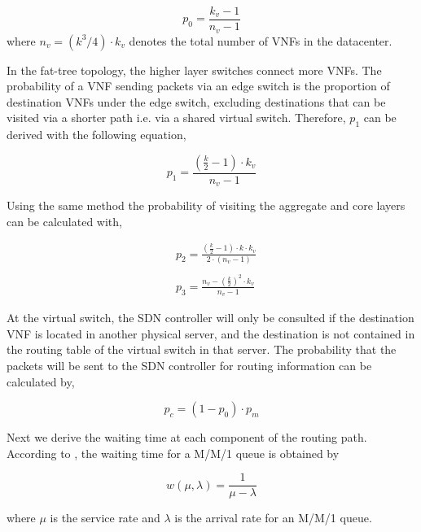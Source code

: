 \begin{equation}
    \label{eq:p_vm}
    p_{0} = \frac{k_{v} - 1}{n_v - 1}
\end{equation}
\noindent where $n_v = (k^3/4)\cdot k_v$ denotes the total number of VNFs in the datacenter.

In the fat-tree topology, the higher layer switches connect more VNFs. The probability of a VNF sending packets via an edge switch is the proportion of destination VNFs under the edge switch, excluding destinations that can be visited via a shorter path i.e. via a shared virtual switch. Therefore, $p_1$ can be derived with the following equation,

\begin{equation}
    \label{eq:p_edge}
    p_{1} = \frac{\left(\frac{k}{2}-1\right) \cdot k_v}{n_v - 1}
\end{equation}

Using the same method the probability of visiting the aggregate and core layers can be calculated with,

\begin{align}
    \label{eq:p_agg_core}
     & p_{2} = \frac{\left(\frac{k}{2}-1\right)\cdot k \cdot k_v }{2 \cdot (n_v-1) } \\ \nonumber \\
     & p_{3} = \frac{n_v - \left(\frac{k}{2}\right)^2 \cdot k_{v}}{n_v - 1}
\end{align}

At the virtual switch, the SDN controller will only be consulted if the destination VNF is located in another physical server, and the destination is not contained in the routing table of the virtual switch in that server. The probability that the packets will be sent to the SDN controller for routing information can be calculated by,

\begin{equation}
    \label{eq:p_sdn}
    p_{c} = (1 - p_{0}) \cdot p_m
\end{equation}

Next we derive the waiting time at each component of the routing path. According to \cite{Kleinrock75}, the waiting time for a M/M/1 queue is obtained by

\begin{equation}
    \label{eq:p_latency}
    w(\mu, \lambda) = \frac{1}{\mu - \lambda}
\end{equation}

\noindent where $\mu$ is the service rate and $\lambda$ is the arrival rate for an M/M/1 queue.

